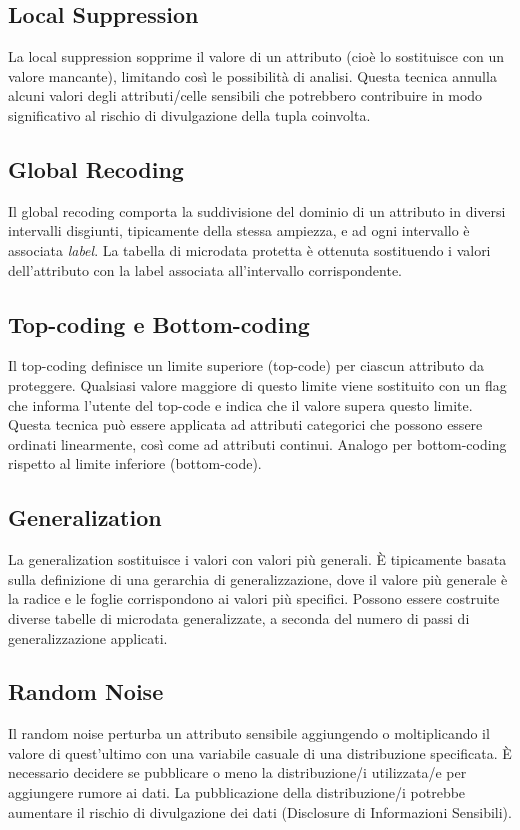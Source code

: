\documentclass{report}
\begin{document}
\subsection{Local Suppression}
La local suppression sopprime il valore di un attributo (cioè lo sostituisce con un valore mancante), limitando così le possibilità di analisi. 
Questa tecnica annulla alcuni valori degli attributi/celle sensibili che potrebbero contribuire in modo significativo al rischio di divulgazione della tupla coinvolta.

\subsection{Global Recoding}
Il global recoding comporta la suddivisione del dominio di un attributo in diversi intervalli disgiunti, tipicamente della stessa ampiezza, e ad ogni intervallo è associata \textit{label}. 
La tabella di microdata protetta è ottenuta sostituendo i valori dell'attributo con la label associata all'intervallo corrispondente.

\subsection{Top-coding e Bottom-coding}
Il top-coding definisce un limite superiore (top-code) per ciascun attributo da proteggere. Qualsiasi valore maggiore di questo limite viene sostituito con un flag che informa l'utente del top-code e indica che il valore supera questo limite. Questa tecnica può essere applicata ad attributi categorici che possono essere ordinati linearmente, così come ad attributi continui.
Analogo per bottom-coding rispetto al limite inferiore (bottom-code).

\subsection{Generalization}
La generalization sostituisce i valori con valori più generali. È tipicamente basata sulla definizione di una gerarchia di generalizzazione, dove il valore più generale è la radice e le foglie corrispondono ai valori più specifici. 
Possono essere costruite diverse tabelle di microdata generalizzate, a seconda del numero di passi di generalizzazione applicati.

\subsection{Random Noise}
Il random noise perturba un attributo sensibile aggiungendo o moltiplicando il valore di quest'ultimo con una variabile casuale di una distribuzione specificata. 
È necessario decidere se pubblicare o meno la distribuzione/i utilizzata/e per aggiungere rumore ai dati. 
La pubblicazione della distribuzione/i potrebbe aumentare il rischio di divulgazione dei dati (Disclosure di Informazioni Sensibili).
\end{document}
